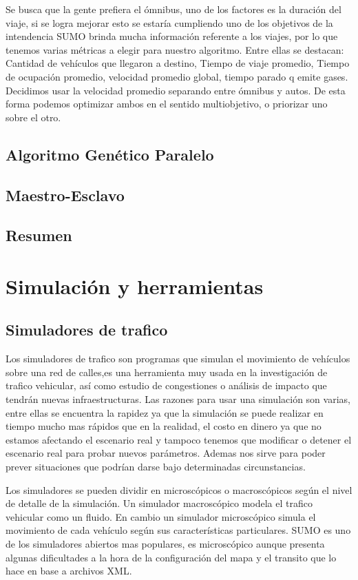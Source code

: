 Se busca que la gente prefiera el ómnibus, uno de los factores es la duración del viaje, si se logra mejorar esto se estaría cumpliendo uno de los objetivos de la intendencia
SUMO brinda mucha información referente a los viajes, por lo que tenemos varias métricas a elegir para nuestro algoritmo. Entre ellas se destacan: Cantidad de vehículos que llegaron a destino, Tiempo de viaje promedio, Tiempo de ocupación promedio, velocidad promedio global, tiempo parado q emite gases. Decidimos usar la velocidad promedio separando entre ómnibus y autos. De esta forma podemos optimizar ambos en el sentido multiobjetivo, o priorizar uno sobre el otro.


\subsection{Algoritmo Genético Paralelo}
\subsection{Maestro-Esclavo}
\subsection{Resumen}




\section{Simulación y herramientas}

\subsection{Simuladores de trafico}
Los simuladores de trafico son programas que simulan el movimiento de vehículos sobre una red de calles,es una herramienta muy usada en la investigación de trafico vehicular, así como estudio de congestiones o análisis de impacto que tendrán nuevas infraestructuras.  Las razones para usar una simulación son varias, entre ellas se encuentra  la rapidez  ya que la simulación se puede realizar en tiempo mucho mas rápidos que en la realidad, el costo en dinero ya que no estamos afectando el escenario real  y tampoco tenemos que modificar o detener el escenario real para probar nuevos parámetros. Ademas nos sirve para poder prever situaciones que podrían darse bajo determinadas circunstancias.

Los simuladores se pueden dividir en microscópicos o macroscópicos según el nivel de detalle de la simulación. Un simulador macroscópico modela  el trafico vehicular como un fluido. En cambio un simulador microscópico simula el movimiento de cada vehículo según sus características particulares.
SUMO es uno de los simuladores abiertos mas populares,  es microscópico aunque presenta algunas dificultades a la hora de la configuración del mapa y el transito que lo hace en base a archivos XML.

